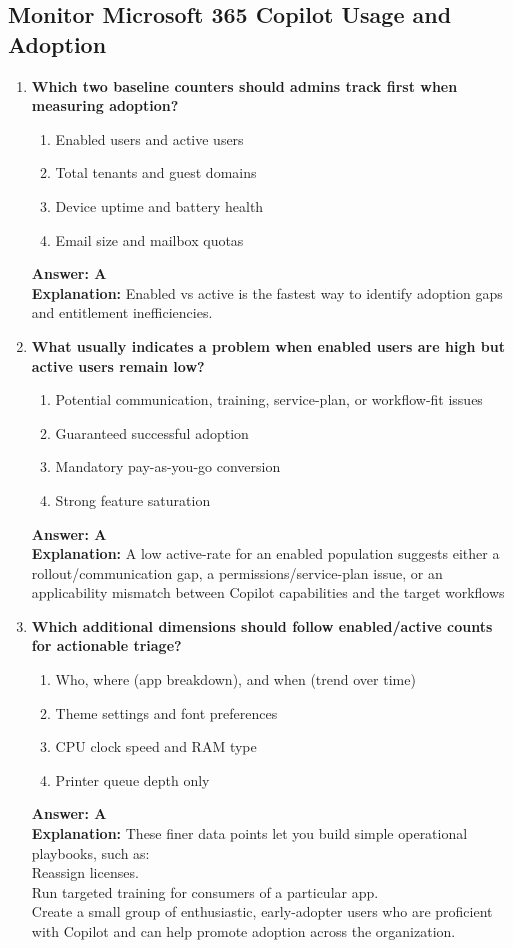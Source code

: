 \documentclass[10pt]{article}
\begin{document}
\clearpage
\subsection{Monitor Microsoft 365 Copilot Usage and Adoption}
\begin{enumerate}[leftmargin=*]

\item \textbf{Which two baseline counters should admins track first when measuring adoption?}
\begin{enumerate}[label=\Alph*.]
  \item Enabled users and active users
  \item Total tenants and guest domains
  \item Device uptime and battery health
  \item Email size and mailbox quotas
\end{enumerate}
\textbf{Answer: A}\\
\textbf{Explanation:} Enabled vs active is the fastest way to identify adoption gaps and entitlement inefficiencies.

\item \textbf{What usually indicates a problem when enabled users are high but active users remain low?}
\begin{enumerate}[label=\Alph*.]
  \item Potential communication, training, service-plan, or workflow-fit issues
  \item Guaranteed successful adoption
  \item Mandatory pay-as-you-go conversion
  \item Strong feature saturation
\end{enumerate}
\textbf{Answer: A}\\
\textbf{Explanation:} A low active-rate for an enabled population suggests either a rollout/communication gap, a permissions/service-plan issue, or an applicability mismatch between Copilot capabilities and the target workflows

\item \textbf{Which additional dimensions should follow enabled/active counts for actionable triage?}
\begin{enumerate}[label=\Alph*.]
  \item Who, where (app breakdown), and when (trend over time)
  \item Theme settings and font preferences
  \item CPU clock speed and RAM type
  \item Printer queue depth only
\end{enumerate}
\textbf{Answer: A}\\
\textbf{Explanation:} These finer data points let you build simple operational playbooks, such as:\\
Reassign licenses.\\
Run targeted training for consumers of a particular app.\\
Create a small group of enthusiastic, early-adopter users who are proficient with Copilot and can help promote adoption across the organization.


\end{enumerate}
\end{document}
